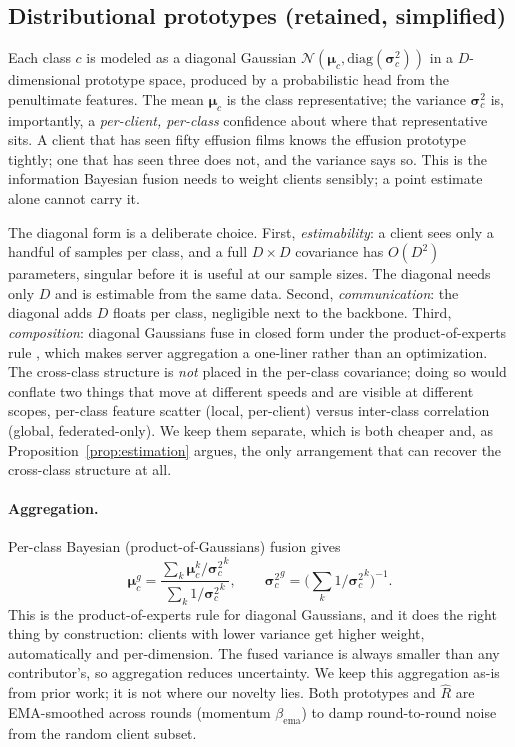 \documentclass[11pt,a4paper]{article}
\theoremstyle{definition}
\newcommand{\Rhat}{\widehat{R}}
\newcommand{\bc}{\boldsymbol{\mu}_c}
\newcommand{\sigc}{\boldsymbol{\sigma}_c^{2}}
\begin{document}
\subsection{Distributional prototypes (retained, simplified)}
\label{sec:protos}

Each class $c$ is modeled as a diagonal Gaussian $\mathcal{N}(\bc,\mathrm{diag}(\sigc))$ in a $D$-dimensional prototype space, produced by a probabilistic head from the penultimate features. The mean $\bc$ is the class representative; the variance $\sigc$ is, importantly, a \emph{per-client, per-class} confidence about where that representative sits. A client that has seen fifty effusion films knows the effusion prototype tightly; one that has seen three does not, and the variance says so. This is the information Bayesian fusion needs to weight clients sensibly; a point estimate alone cannot carry it.

The diagonal form is a deliberate choice. First, \emph{estimability}: a client sees only a handful of samples per class, and a full $D\times D$ covariance has $O(D^{2})$ parameters, singular before it is useful at our sample sizes. The diagonal needs only $D$ and is estimable from the same data. Second, \emph{communication}: the diagonal adds $D$ floats per class, negligible next to the backbone. Third, \emph{composition}: diagonal Gaussians fuse in closed form under the product-of-experts rule \citep{hinton2002poe}, which makes server aggregation a one-liner rather than an optimization. The cross-class structure is \emph{not} placed in the per-class covariance; doing so would conflate two things that move at different speeds and are visible at different scopes, per-class feature scatter (local, per-client) versus inter-class correlation (global, federated-only). We keep them separate, which is both cheaper and, as Proposition~\ref{prop:estimation} argues, the only arrangement that can recover the cross-class structure at all.

\paragraph{Aggregation.} Per-class Bayesian (product-of-Gaussians) fusion gives
\begin{equation}
\boldsymbol\mu_c^{g}=\frac{\sum_k \bc^{k}/{\sigc}^{k}}{\sum_k 1/{\sigc}^{k}},
\qquad
{\sigc}^{g}=\Big(\sum_k 1/{\sigc}^{k}\Big)^{-1}.
\label{eq:bayesfusion}
\end{equation}
This is the product-of-experts rule for diagonal Gaussians, and it does the right thing by construction: clients with lower variance get higher weight, automatically and per-dimension. The fused variance is always smaller than any contributor's, so aggregation reduces uncertainty. We keep this aggregation as-is from prior work; it is not where our novelty lies. Both prototypes and $\Rhat$ are EMA-smoothed across rounds (momentum $\beta_{\text{ema}}$) to damp round-to-round noise from the random client subset.
\end{document}
